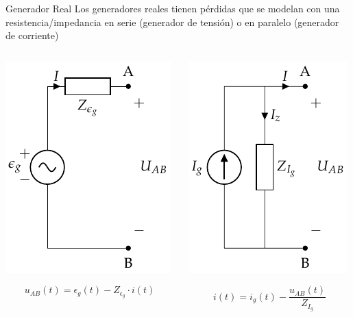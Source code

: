 \documentclass[xcolor={usenames,svgnames,dvipsnames}]{beamer}
\begin{document}
\begin{frame}[label={sec:org17bff9c}]{Generador Real}
Los generadores reales tienen pérdidas que se modelan con una resistencia/impedancia en \alert{serie} (generador de tensión) o en \alert{paralelo} (generador de corriente)

\begin{columns}
\begin{column}{0.5\columnwidth}
\begin{center}
\includegraphics[height=0.5\textheight]{figs/FuenteTensionReal.pdf}
\end{center}
\[
  u_{AB}(t) = \epsilon_g(t) - Z_{\epsilon_g} \cdot i(t)
\]
\end{column}
\begin{column}{0.5\columnwidth}
\begin{center}
\includegraphics[height=0.5\textheight]{figs/FuenteCorrienteReal.pdf}
\end{center}
\[
  i(t) = i_g(t) - \frac{u_{AB}(t)}{Z_{I_g}}
\]
\end{column}
\end{columns}
\end{frame}
\end{document}
